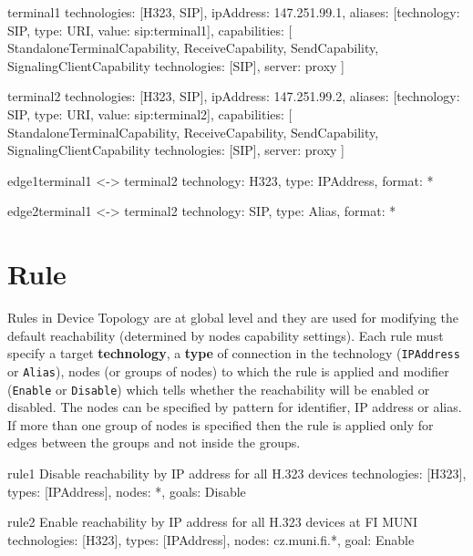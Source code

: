 \begin{EntityExample}{}{terminal1}{}
technologies: [H323, SIP],
ipAddress: 147.251.99.1,
aliases: [{technology: SIP, type: URI, value: sip:terminal1}],
capabilities: [
  StandaloneTerminalCapability,
  ReceiveCapability, SendCapability,
  SignalingClientCapability {technologies: [SIP], server: proxy}
]
\end{EntityExample}

\begin{EntityExample}{}{terminal2}{}
technologies: [H323, SIP],
ipAddress: 147.251.99.2,
aliases: [{technology: SIP, type: URI, value: sip:terminal2}],
capabilities: [
  StandaloneTerminalCapability,
  ReceiveCapability, SendCapability,
  SignalingClientCapability {technologies: [SIP], server: proxy}
]
\end{EntityExample}

\begin{EntityExample}{}{edge1}{terminal1 <-> terminal2}
technology: H323,
type: IPAddress,
format: *
\end{EntityExample}

\begin{EntityExample}{}{edge2}{terminal1 <-> terminal2}
technology: SIP,
type: Alias,
format: *
\end{EntityExample} 
  
  
\section{Rule}
Rules in Device Topology are at global level and they are used for modifying 
the default reachability (determined by nodes capability settings). Each rule 
must specify a target \textbf{technology}, a \textbf{type} of connection in 
the technology (\verb|IPAddress| or \verb|Alias|), 
nodes (or groups of nodes) 
to which the rule is applied and modifier (\verb|Enable| or \verb|Disable|) 
which tells whether the reachability will be enabled or disabled. The nodes 
can be specified by pattern for identifier, IP address or alias. If more than 
one group of nodes is specified then the rule is applied only for edges 
between the groups and not inside the groups.

\begin{EntityExample}{}{rule1}%
      {Disable reachability by IP address for all H.323 devices}
technologies: [H323],
types: [IPAddress],
nodes: *,
goals: Disable
\end{EntityExample}

\begin{EntityExample}{}{rule2}%
      {Enable reachability by IP address for all H.323 devices at FI MUNI}
technologies: [H323],
types: [IPAddress],
nodes: cz.muni.fi.*,
goal: Enable
\end{EntityExample}

